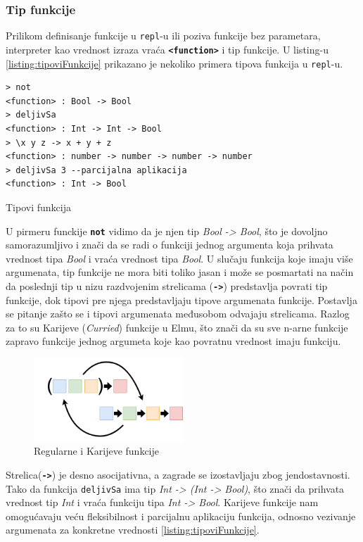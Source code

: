 \documentclass[12pt,oneside]{memoir}
\begin{document}
\subsubsection{Tip funkcije}
Prilikom definisanje funkcije u \texttt{repl}-u ili poziva funkcije bez parametara,
interpreter kao vrednost izraza vraća \texttt{\textbf{<function>}} i tip funkcije.
U listing-u  \ref{listing:tipoviFunkcije} prikazano je nekoliko primera tipova 
funkcija u \texttt{repl}-u.
\begin{listing}[h]
\begin{verbatim}
> not
<function> : Bool -> Bool
> deljivSa
<function> : Int -> Int -> Bool
> \x y z -> x + y + z
<function> : number -> number -> number -> number
> deljivSa 3 --parcijalna aplikacija
<function> : Int -> Bool
\end{verbatim}
\caption{Tipovi funkcija}
\label{listing:tipoviFunkcije}
\end{listing} 
  
U pirmeru funckije \texttt{\textbf{not}} vidimo da je njen tip \emph{Bool -> Bool},
što je dovoljno samorazumljivo i znači da se radi o funkciji jednog argumenta koja
prihvata vrednost tipa \emph{Bool} i vraća vrednost tipa \emph{Bool}. U slučaju
funkcija koje imaju više argumenata, tip funkcije ne mora biti toliko jasan i može 
se posmartati na način da poslednji tip u nizu razdvojenim strelicama
(\texttt{\textbf{->}}) predstavlja povrati tip funkcije, dok tipovi pre njega 
predstavljaju tipove argumenata funkcije. Postavlja se pitanje zašto se i tipovi 
argumenata međusobom odvajaju strelicama. Razlog za to su Karijeve (\emph{Curried})
funkcije u Elmu, što znači da su sve n-arne funkcije zapravo funkcije jednog argumeta
koje kao povratnu vrednost imaju funkciju.
\begin{figure}[!h]
  \centering
  \includegraphics[width=0.5\textwidth]{currying.png}
  \caption{Regularne i Karijeve funkcije}
\end{figure}
Strelica(\texttt{\textbf{->}}) je desno asocijativna, a zagrade se izostavljaju zbog
jendostavnosti. Tako da funkcija \texttt{deljivSa} ima tip \emph{Int -> (Int -> Bool)},
što znači da prihvata vrednost tip \emph{Int} i vraća funkciju tipa \emph{Int -> Bool}.
Karijeve funkcije nam omogućavaju veću fleksibilnost i parcijalnu aplikaciju funkcija, 
odnosno vezivanje argumenata za konkretne vrednosti \ref{listing:tipoviFunkcije}.
\end{document}
